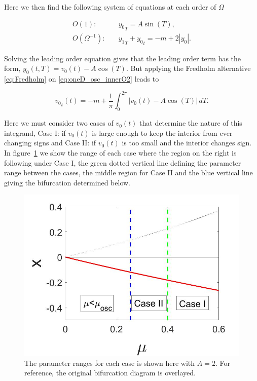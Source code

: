 Here we then find the following system of equations at each order of $\Omega$

\begin{align}
\label{eq:oneD_osc_innerO1}
O(1):\quad & {y_0}_T = A\sin(T),\\
\label{eq:oneD_osc_innerO2}
O(\Omega^{-1}):\quad & {y_1}_T+{y_0}_t =  -m+2|y_0|.
\end{align}

Solving the leading order equation \label{eq:oneD_osc_innerO1} gives that the leading order term has the form, $y_0(t,T)=v_0(t)-A\cos(T)$. But applying the Fredholm alternative \eqref{eq:Fredholm} on \eqref{eq:oneD_osc_innerO2} leads to

\begin{equation}\label{eq:oneD_osc_integral}
{v_0}_t(t)=-m+\frac{1}{\pi}\int_0^{2\pi} |v_0(t)-A\cos(T)|\,dT.
\end{equation}

Here we must consider two cases of $v_0(t)$ that determine the nature of this integrand, Case I: if $v_0(t)$ is large enough to keep the interior from ever changing signs and Case II: if $v_0(t)$ is too small and the interior changes sign. In figure~\ref{fig:oneD_osc_cases} we show the range of each case where the region on the right is following under Case I, the green dotted vertical line defining the parameter range between the cases, the middle region for Case II and the blue vertical line giving the bifurcation determined below.

\begin{figure}[H]
\centering
\includegraphics[width=.7\textwidth]{oneD/osc_cases.jpg}
\caption{The parameter ranges for each case is shown here with $A=2$. For reference, the original bifurcation diagram is overlayed.}
\label{fig:oneD_osc_cases}
\end{figure}

